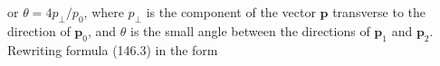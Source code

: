 or $\theta=4p_\perp/p_0$, where $p_\perp$ is the component of the vector $\mathbf p$ transverse to the direction of $\mathbf p_0$, and $\theta$ is the small angle between the directions of $\mathbf p_1$ and $\mathbf p_2$. Rewriting formula (146.3) in the form
